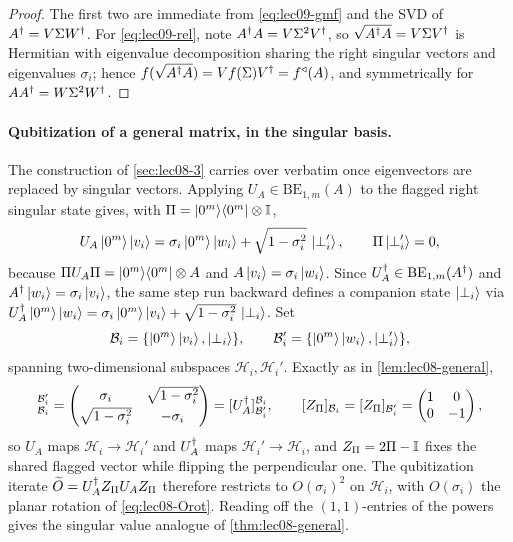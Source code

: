 \begin{proof}
The first two are immediate from \eqref{eq:lec09-gmf} and the SVD of $A^{\dagger}=V\Sigma
W^{\dagger}$. For \eqref{eq:lec09-rel}, note $A^{\dagger} A=V\Sigma^2 V^{\dagger}$, so
$\sqrt{A^{\dagger} A}=V\Sigma V^{\dagger}$ is Hermitian with eigenvalue decomposition sharing the
right singular vectors and eigenvalues $\sigma_i$; hence
$f(\sqrt{A^{\dagger} A})=Vf(\Sigma)V^{\dagger}=f^{\triangleleft}(A)$, and symmetrically for
$AA^{\dagger}=W\Sigma^2W^{\dagger}$.
\end{proof}

\paragraph{Qubitization of a general matrix, in the singular basis.}
The construction of \cref{sec:lec08-3} carries over verbatim once eigenvectors are
replaced by singular vectors. Applying $U_A\in\mathrm{BE}_{1,m}(A)$ to the flagged
right singular state gives, with $\Pi=\ket{0^m}\!\bra{0^m}\otimes\mathbb{I}$,
\begin{equation}
  U_A\ket{0^m}\ket{v_i}=\sigma_i\ket{0^m}\ket{w_i}
     +\sqrt{1-\sigma_i^2}\,\ket{\perp_i'},\qquad \Pi\ket{\perp_i'}=0,
  \label{eq:lec09-apply}
\end{equation}
because $\Pi U_A\Pi=\ket{0^m}\!\bra{0^m}\otimes A$ and $A\ket{v_i}=\sigma_i\ket{w_i}$. Since
$U_A^{\dagger}\in\mathrm{BE}_{1,m}(A^{\dagger})$ and $A^{\dagger}\ket{w_i}=\sigma_i\ket{v_i}$, the same step
run backward defines a companion state $\ket{\perp_i}$ via
$U_A^{\dagger}\ket{0^m}\ket{w_i}=\sigma_i\ket{0^m}\ket{v_i}+\sqrt{1-\sigma_i^2}\,\ket{\perp_i}$.
Set
\begin{equation}
  \mathcal B_i=\{\ket{0^m}\ket{v_i},\ket{\perp_i}\},\qquad
  \mathcal B_i'=\{\ket{0^m}\ket{w_i},\ket{\perp_i'}\},
  \label{eq:lec09-bases}
\end{equation}
spanning two-dimensional subspaces $\mathcal H_i,\mathcal H_i'$. Exactly as in
\cref{lem:lec08-general},
\begin{equation}
  [U_A]^{\mathcal B_i'}_{\mathcal B_i}
  =\begin{pmatrix}\sigma_i&\sqrt{1-\sigma_i^2}\\[2pt]
    \sqrt{1-\sigma_i^2}&-\sigma_i\end{pmatrix}
  =[U_A\dg]^{\mathcal B_i}_{\mathcal B_i'},\qquad
  [Z_\Pi]_{\mathcal B_i}=[Z_\Pi]_{\mathcal B_i'}=\begin{pmatrix}1&0\\0&-1\end{pmatrix},
  \label{eq:lec09-blocks}
\end{equation}
so $U_A$ maps $\mathcal H_i\to\mathcal H_i'$ and $U_A^{\dagger}$ maps $\mathcal H_i'\to
\mathcal H_i$, and $Z_\Pi=2\Pi-\mathbb{I}$ fixes the shared flagged vector while flipping the
perpendicular one. The qubitization iterate $\widetilde O=U_A^{\dagger} Z_\Pi U_A Z_\Pi$
therefore restricts to $O(\sigma_i)^2$ on $\mathcal H_i$, with $O(\sigma_i)$ the planar
rotation of \eqref{eq:lec08-Orot}. Reading off the $(1,1)$-entries of the powers gives
the singular value analogue of \cref{thm:lec08-general}.

